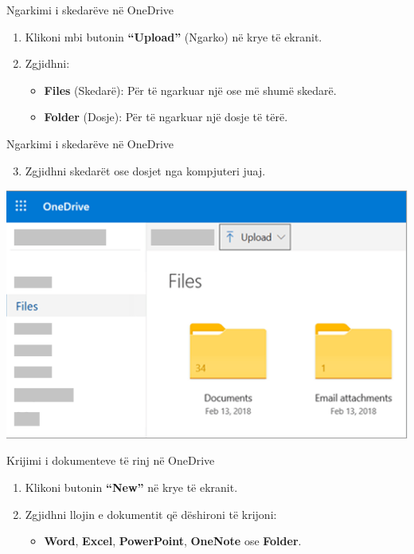 \documentclass[
  ignorenonframetext,
]{beamer}
\providecommand{\tightlist}{%
  \setlength{\itemsep}{0pt}\setlength{\parskip}{0pt}}
\begin{document}
\begin{frame}{Ngarkimi i skedarëve në OneDrive}
\label{ngarkimi-i-skedaruxebve-nuxeb-onedrive}
\begin{enumerate}
\item
  Klikoni mbi butonin \textbf{``Upload''} (Ngarko) në krye të ekranit.
\item
  Zgjidhni:

  \begin{itemize}
  \item
    \textbf{Files} (Skedarë): Për të ngarkuar një ose më shumë skedarë.
  \item
    \textbf{Folder} (Dosje): Për të ngarkuar një dosje të tërë.
  \end{itemize}
\end{enumerate}
\end{frame}

\begin{frame}{Ngarkimi i skedarëve në OneDrive}
\label{ngarkimi-i-skedaruxebve-nuxeb-onedrive-1}
\begin{enumerate}
\setcounter{enumi}{2}
\tightlist
\item
  Zgjidhni skedarët ose dosjet nga kompjuteri juaj.
\end{enumerate}

\includegraphics{./images/onedrive3.png}
\end{frame}

\begin{frame}{Krijimi i dokumenteve të rinj në OneDrive}
\label{krijimi-i-dokumenteve-tuxeb-rinj-nuxeb-onedrive}
\begin{enumerate}
\item
  Klikoni butonin \textbf{``New''} në krye të ekranit.
\item
  Zgjidhni llojin e dokumentit që dëshironi të krijoni:

  \begin{itemize}
  \tightlist
  \item
    \textbf{Word}, \textbf{Excel}, \textbf{PowerPoint}, \textbf{OneNote}
    ose \textbf{Folder}.
  \end{itemize}
\end{enumerate}
\end{frame}
\end{document}
